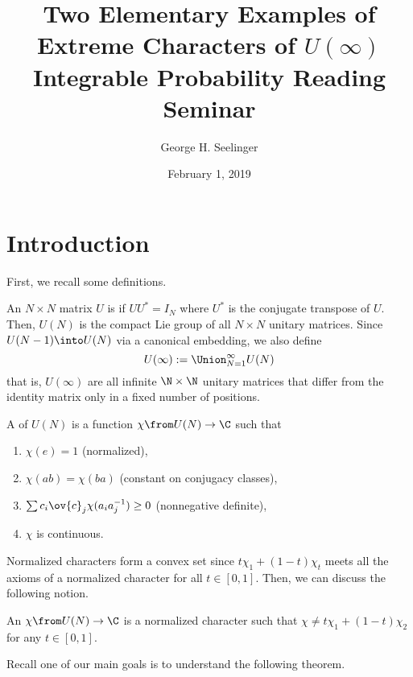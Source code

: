 \documentclass[11pt,leqno,oneside]{amsart}
\title[Two Elementary Examples of Extreme Characters of
  \(U(\infty)\)]{Two Elementary Examples of Extreme Characters of
  \(U(\infty)\) \\ Integrable Probability Reading Seminar}
\author{George H. Seelinger}
\date{February 1, 2019}
\numberwithin{thm}{section}
\begin{document}
\maketitle
\section{Introduction}
First, we recall some definitions.
\begin{defn}
  An \(N \times N\) matrix \(U\) is  if \(U U^* = I_N\)
  where \(U^*\) is the conjugate transpose of \(U\). Then, \(U(N)\) is
  the compact Lie group of all \(N \times N\) unitary matrices. Since
  \(U(N-1) \into U(N)\) via a canonical embedding, we also define \[
    U(\infty) := \Union_{N=1}^\infty U(N)
  \]
  that is, \(U(\infty)\) are all infinite \(\N \times \N\) unitary
  matrices that differ from the identity matrix only in a fixed number
  of positions.
\end{defn}
\begin{defn}
  A  of \(U(N)\) is a function \(\chi
  \from U(N) \to \C\) such that
  \begin{enumerate}
  \item \(\chi(e) = 1\) (normalized),
  \item \(\chi(ab) = \chi(ba)\) (constant on conjugacy classes),
  \item \(\sum c_i \ov{c}_j \chi(a_i a_j^{-1}) \geq 0\) (nonnegative
    definite),
  \item \(\chi\) is continuous.
  \end{enumerate}
\end{defn}
Normalized characters form a convex set since \(t \chi_1 + (1-t)
\chi_t\) meets all the axioms of a normalized character for all \(t
\in [0,1]\). Then, we can discuss the following notion.
\begin{defn}
  An  \(\chi \from U(N) \to \C\) is a normalized
  character such that \(\chi \neq t \chi_1 + (1-t) \chi_2\) for any
  \(t \in [0,1]\).
\end{defn}
Recall one of our main goals is to understand the following theorem.
\end{document}
